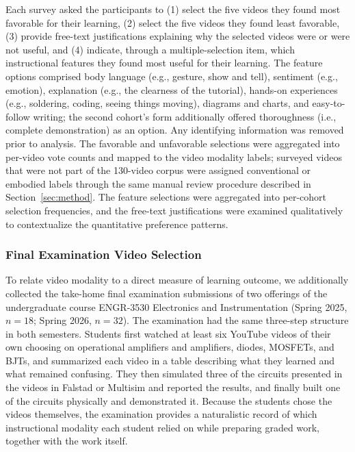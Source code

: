 \documentclass[fleqn,10pt]{JLA_article} %
\begin{document}
Each survey asked the participants to (1) select the five videos they found most favorable for their learning, (2) select the five videos they found least favorable, (3) provide free-text justifications explaining why the selected videos were or were not useful, and (4) indicate, through a multiple-selection item, which instructional features they found most useful for their learning. The feature options comprised body language (e.g., gesture, show and tell), sentiment (e.g., emotion), explanation (e.g., the clearness of the tutorial), hands-on experiences (e.g., soldering, coding, seeing things moving), diagrams and charts, and easy-to-follow writing; the second cohort's form additionally offered thoroughness (i.e., complete demonstration) as an option. Any identifying information was removed prior to analysis. The favorable and unfavorable selections were aggregated into per-video vote counts and mapped to the video modality labels; surveyed videos that were not part of the 130-video corpus were assigned conventional or embodied labels through the same manual review procedure described in Section~\ref{sec:method}. The feature selections were aggregated into per-cohort selection frequencies, and the free-text justifications were examined qualitatively to contextualize the quantitative preference patterns.

\subsubsection{Final Examination Video Selection}
\label{sec:exam_method}

To relate video modality to a direct measure of learning outcome, we additionally collected the take-home final examination submissions of two offerings of the undergraduate course ENGR-3530 Electronics and Instrumentation (Spring 2025, $n = 18$; Spring 2026, $n = 32$). The examination had the same three-step structure in both semesters. Students first watched at least six YouTube videos of their own choosing on operational amplifiers and amplifiers, diodes, MOSFETs, and BJTs, and summarized each video in a table describing what they learned and what remained confusing. They then simulated three of the circuits presented in the videos in Falstad or Multisim and reported the results, and finally built one of the circuits physically and demonstrated it. Because the students chose the videos themselves, the examination provides a naturalistic record of which instructional modality each student relied on while preparing graded work, together with the work itself.
\end{document}
